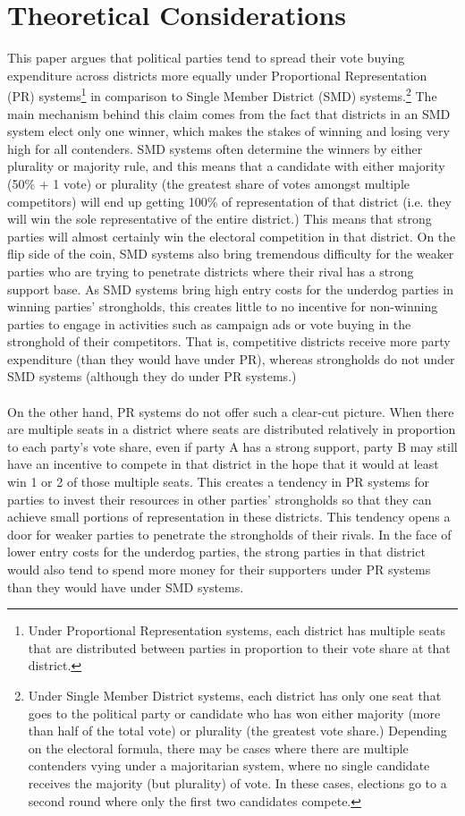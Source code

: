 \documentclass{article}
\begin{document}
\section{Theoretical Considerations}
This paper argues that political parties tend to spread their vote buying expenditure across districts more equally under Proportional Representation (PR) systems\footnote{Under Proportional Representation systems, each district has multiple seats that are distributed between parties in proportion to their vote share at that district.} in comparison to Single Member District (SMD) systems.\footnote{Under Single Member District systems, each district has only one seat that goes to the political party or candidate who has won either majority (more than half of the total vote) or plurality (the greatest vote share.) Depending on the electoral formula, there may be cases where there are multiple contenders vying under a majoritarian system, where no single candidate receives the majority (but plurality) of vote. In these cases, elections go to a second round where only the first two candidates compete.} The main mechanism behind this claim comes from the fact that districts in an SMD system elect only one winner, which makes the stakes of winning and losing very high for all contenders. SMD systems often determine the winners by either plurality or majority rule, and this means that a candidate with either majority (50\% + 1 vote) or plurality (the greatest share of votes amongst multiple competitors) will end up getting 100\% of representation of that district (i.e. they will win the sole representative of the entire district.) This means that strong parties will almost certainly win the electoral competition in that district. On the flip side of the coin, SMD systems also bring tremendous difficulty for the weaker parties who are trying to penetrate districts where their rival has a strong support base. As SMD systems bring high entry costs for the underdog parties in winning parties’ strongholds, this creates little to no incentive for non-winning parties to engage in activities such as campaign ads or vote buying in the stronghold of their competitors. That is, competitive districts receive more party expenditure (than they would have under PR), whereas strongholds do not under SMD systems (although they do under PR systems.)\\ 
\\
On the other hand, PR systems do not offer such a clear-cut picture. When there are multiple seats in a district where seats are distributed relatively in proportion to each party’s vote share, even if party A has a strong support, party B may still have an incentive to compete in that district in the hope that it would at least win 1 or 2 of those multiple seats. This creates a tendency in PR systems for parties to invest their resources in other parties' strongholds so that they can achieve small portions of representation in these districts. This tendency opens a door for weaker parties to penetrate the strongholds of their rivals. In the face of lower entry costs for the underdog parties, the strong parties in that district would also tend to spend more money for their supporters under PR systems than they would have under SMD systems.\\
\end{document}
